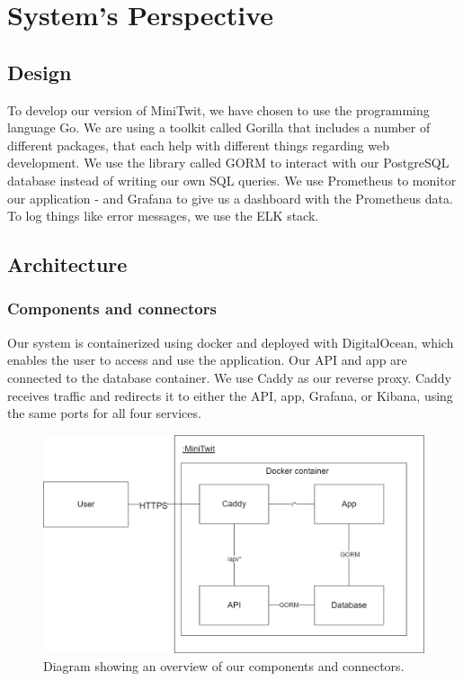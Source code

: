 \section{System's Perspective}

\subsection{Design}
To develop our version of MiniTwit, we have chosen to use the programming language Go. We are using a toolkit called Gorilla that includes a number of different packages, that each help with different things regarding web development. We use the library called GORM to interact with our PostgreSQL database instead of writing our own SQL queries. We use Prometheus to monitor our application - and Grafana to give us a dashboard with the Prometheus data. To log things like error messages, we use the ELK stack.


\subsection{Architecture}

\subsubsection{Components and connectors}
Our system is containerized using docker and deployed with DigitalOcean, which enables the user to access and use the application.
Our API and app are connected to the database container. We use Caddy as our reverse proxy. Caddy receives traffic and redirects it to either the API, app, Grafana, or Kibana, using the same ports for all four services.

\begin{figure}[H]
    \centering
    \includegraphics[scale=0.40]{images/C&C_diagram.png}
    \caption{Diagram showing an overview of our components and connectors.}
    \label{fig:CCDiagram}
\end{figure}


